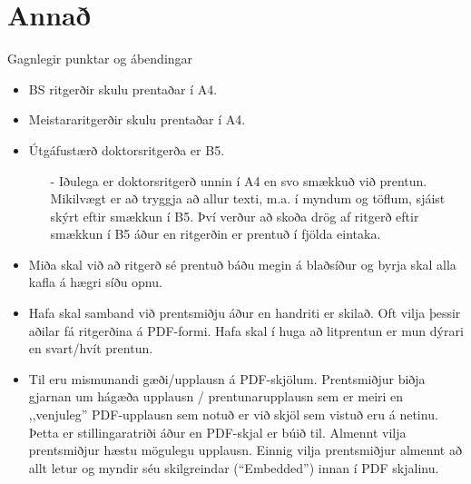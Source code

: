 \documentclass[a4paper,12pt,twoside,BCOR=10mm]{scrbook}
\begin{document}
\appendix
\renewcommand{\chaptername}{Appendix}
\chapter{Annað}
Gagnlegir punktar og ábendingar
\begin{itemize}
 \item BS ritgerðir skulu prentaðar í A4.
 \item Meistararitgerðir skulu prentaðar í A4.
 \item Útgáfustærð doktorsritgerða er B5.
\begin{itemize}
 \item[-] Iðulega er doktorsritgerð unnin í A4 en svo smækkuð við prentun. Mikilvægt er að tryggja að allur texti, m.a. í myndum og töflum, sjáist skýrt eftir smækkun í B5. Því verður að skoða drög af ritgerð eftir smækkun í B5 áður en ritgerðin er prentuð í fjölda eintaka.
\end{itemize}

\end{itemize}

\begin{itemize}
 \item Miða skal við að ritgerð sé prentuð báðu megin á blaðsíður og byrja skal alla kafla á hægri síðu opnu.
 \item Hafa skal samband við prentsmiðju áður en handriti er skilað. Oft vilja þessir aðilar fá ritgerðina á PDF-formi. Hafa skal í huga að litprentun er mun dýrari en svart/hvít prentun. 
 \item Til eru mismunandi gæði/upplausn á PDF-skjölum. Prentsmiðjur biðja gjarnan um hágæða upplausn / prentunarupplausn sem er meiri en ,,venjuleg” PDF-upplausn sem notuð er við skjöl sem vistuð eru á netinu. Þetta er stillingaratriði áður en PDF-skjal er búið til. Almennt vilja prentsmiðjur hæstu mögulegu upplausn. Einnig vilja prentsmiðjur almennt að allt letur og myndir séu skilgreindar (“Embedded”) innan í PDF skjalinu.
\end{itemize}
\end{document}
